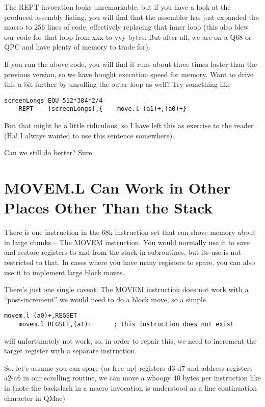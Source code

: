 The REPT invocation looks unremarkable, but if you have a look at the
produced assembly listing, you will find that the assembler has just
expanded the macro to 256 lines of code, effectively replacing that
inner loop (this also blew our code for that loop from xxx to yyy bytes.
But after all, we are on a Q68 or QPC and have plenty of memory to trade
for).

If you run the above code, you will find it runs about three times
faster than the previous version, so we have bought execution speed for
memory. Want to drive this a bit further by unrolling the outer loop as
well? Try something like

\begin{lstlisting}[firstnumber=1,caption={Unrolling the outer loop}]
screenLongs EQU 512*384*2/4
    REPT    [screenLongs],{    move.l (a1)+,(a0)+}
\end{lstlisting}

But that might be a little ridiculous, so I have left this as exercise
to the reader (Ha! I always wanted to use this sentence somewhere).

Can we still do better? Sure.

\section{MOVEM.L Can Work in Other Places Other Than the Stack}

There is one instruction in the 68k instruction set that can shove
memory about in large chunks -- The MOVEM instruction. You would
normally use it to save and restore registers to and from the stack in
subroutines, but its use is not restricted to that. In cases where you
have many registers to spare, you can also use it to implement large
block moves.

There's just one single caveat: The MOVEM instruction does not work with
a ``post-increment'' we would need to do a block move, so a simple

\begin{lstlisting}[firstnumber=1,caption={MOVEM restrictions}]
    movem.l (a0)+,REGSET
    movem.l REGSET,(a1)+      ; this instruction does not exist
\end{lstlisting}

will unfortunately not work, so, in order to repair this, we need to
increment the target register with a separate instruction.

So, let's assume you can spare (or free up) registers d3-d7 and address
registers a2-a6 in our scrolling routine, we can move a whoopy 40 bytes
per instruction like in (note the backslash in a macro invocation is
understood as a line continuation character in QMac)

